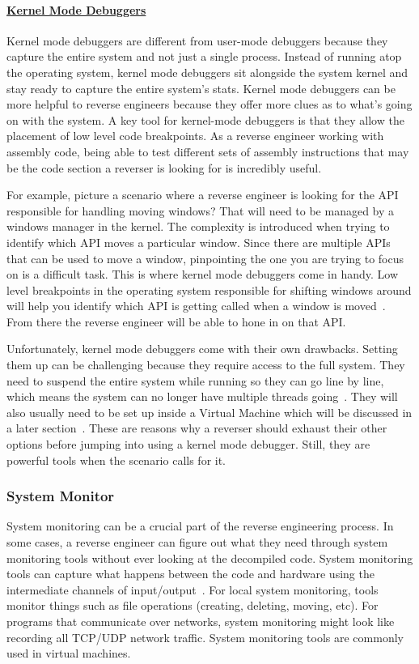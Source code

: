 \paragraph{\underline{Kernel Mode Debuggers}}
Kernel mode debuggers are different from user-mode debuggers because they capture the entire system and not just a single process. 
Instead of running atop the operating system, kernel mode debuggers sit alongside the system kernel and stay ready to capture the entire system’s stats. 
Kernel mode debuggers can be more helpful to reverse engineers because they offer more clues as to what’s going on with the system. 
A key tool for kernel-mode debuggers is that they allow the placement of low level code breakpoints. 
As a reverse engineer working with assembly code, being able to test different sets of assembly instructions that may be the code section a reverser is looking for is incredibly useful.

For example, picture a scenario where a reverse engineer is looking for the API responsible for handling moving windows? 
That will need to be managed by a windows manager in the kernel. 
The complexity is introduced when trying to identify which API moves a particular window. 
Since there are multiple APIs that can be used to move a window, pinpointing the one you are trying to focus on is a difficult task. 
This is where kernel mode debuggers come in handy. 
Low level breakpoints in the operating system responsible for shifting windows around will help you identify which API is getting called when a window is moved~\cite{Reversing}. 
From there the reverse engineer will be able to hone in on that API.

Unfortunately, kernel mode debuggers come with their own drawbacks. 
Setting them up can be challenging because they require access to the full system. 
They need to suspend the entire system while running so they can go line by line, which means the system can no longer have multiple threads going~\cite{Reversing}. 
They will also usually need to be set up inside a Virtual Machine which will be discussed in a later section~\cite{PracticalRE}. 
These are reasons why a reverser should exhaust their other options before jumping into using a kernel mode debugger. 
Still, they are powerful tools when the scenario calls for it.

\subsubsection{System Monitor}
System monitoring can be a crucial part of the reverse engineering process. 
In some cases, a reverse engineer can figure out what they need through system monitoring tools without ever looking at the decompiled code. 
System monitoring tools can capture what happens between the code and hardware using the intermediate channels of input/output~\cite{Reversing}. 
For local system monitoring, tools monitor things such as file operations (creating, deleting, moving, etc). 
For programs that communicate over networks, system monitoring might look like recording all TCP/UDP network traffic. 
System monitoring tools are commonly used in virtual machines.


